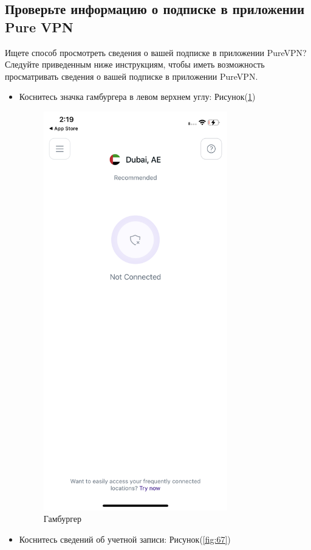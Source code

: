 \subsection{Проверьте информацию о подписке в приложении Pure VPN} 
Ищете способ просмотреть сведения о вашей подписке в приложении PureVPN? Следуйте приведенным ниже инструкциям, чтобы иметь возможность просматривать сведения о вашей подписке в приложении PureVPN.
\begin{itemize}
\item Коснитесь значка гамбургера в левом верхнем углу:  Рисунок(\ref{fig:66})
\begin{figure}[H]
\includegraphics[width=8cm]{47.png}
\centering
\caption{Гамбургер}
\label{fig:66}
\end{figure}
\item Коснитесь сведений об учетной записи:  Рисунок(\ref{fig:67})
\begin{figure}[H]

\end{figure}
\end{itemize}
